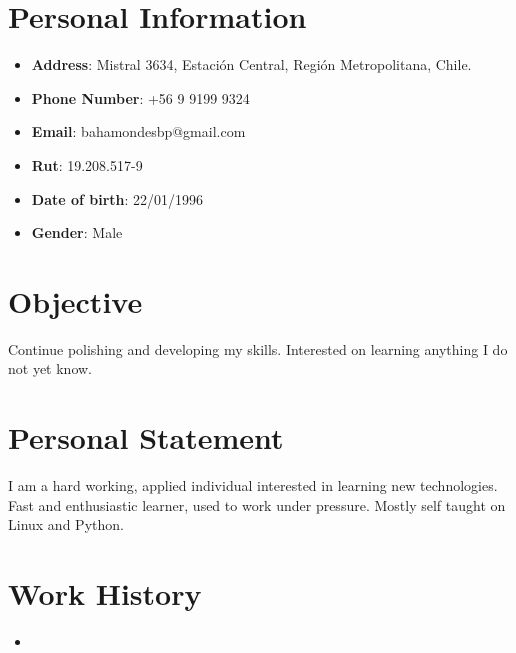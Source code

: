 \documentclass[11pt,a4paper,roman]{moderncv}        %
\begin{document}
\makecvtitle
\vspace*{-10mm}

\section{Personal Information}

\begin{itemize}

\item{\textbf{Address}: Mistral 3634, Estación Central, Región Metropolitana, Chile.}

\item{\textbf{Phone Number}: +56 9 9199 9324}

\item{\textbf{Email}: bahamondesbp@gmail.com}

\item{\textbf{Rut}: 19.208.517-9}

\item{\textbf{Date of birth}: 22/01/1996}

\item{\textbf{Gender}: Male}\\

\end{itemize}

\section{Objective}
\small{ Continue polishing and developing my skills. Interested on learning anything I do not yet know.  }

\section{Personal Statement}
\small{ I am a hard working, applied individual interested in learning new technologies. Fast and enthusiastic learner, used to work under pressure. Mostly self taught on Linux and Python.}

\section{Work History}

\vspace{3pt}

\begin{itemize}

\item{}

\end{itemize}
\end{document}
